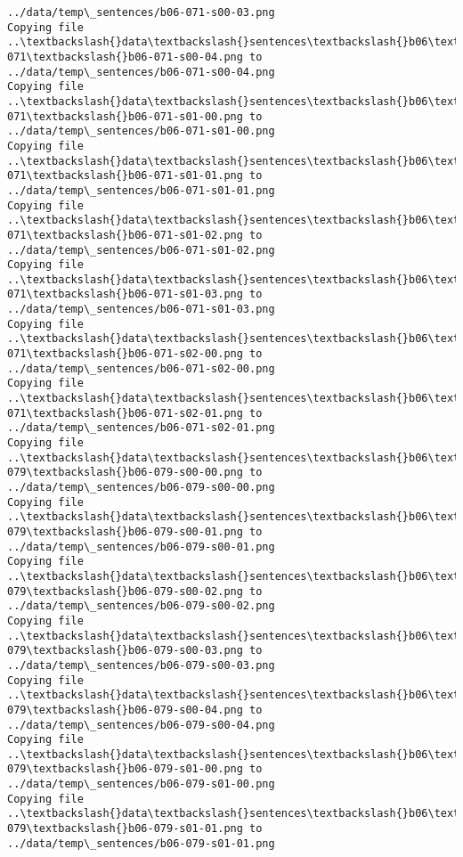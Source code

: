 \documentclass[11pt]{article}
\begin{document}
\begin{Verbatim}[commandchars=\\\{\}]
../data/temp\_sentences/b06-071-s00-03.png
Copying file ..\textbackslash{}data\textbackslash{}sentences\textbackslash{}b06\textbackslash{}b06-071\textbackslash{}b06-071-s00-04.png to
../data/temp\_sentences/b06-071-s00-04.png
Copying file ..\textbackslash{}data\textbackslash{}sentences\textbackslash{}b06\textbackslash{}b06-071\textbackslash{}b06-071-s01-00.png to
../data/temp\_sentences/b06-071-s01-00.png
Copying file ..\textbackslash{}data\textbackslash{}sentences\textbackslash{}b06\textbackslash{}b06-071\textbackslash{}b06-071-s01-01.png to
../data/temp\_sentences/b06-071-s01-01.png
Copying file ..\textbackslash{}data\textbackslash{}sentences\textbackslash{}b06\textbackslash{}b06-071\textbackslash{}b06-071-s01-02.png to
../data/temp\_sentences/b06-071-s01-02.png
Copying file ..\textbackslash{}data\textbackslash{}sentences\textbackslash{}b06\textbackslash{}b06-071\textbackslash{}b06-071-s01-03.png to
../data/temp\_sentences/b06-071-s01-03.png
Copying file ..\textbackslash{}data\textbackslash{}sentences\textbackslash{}b06\textbackslash{}b06-071\textbackslash{}b06-071-s02-00.png to
../data/temp\_sentences/b06-071-s02-00.png
Copying file ..\textbackslash{}data\textbackslash{}sentences\textbackslash{}b06\textbackslash{}b06-071\textbackslash{}b06-071-s02-01.png to
../data/temp\_sentences/b06-071-s02-01.png
Copying file ..\textbackslash{}data\textbackslash{}sentences\textbackslash{}b06\textbackslash{}b06-079\textbackslash{}b06-079-s00-00.png to
../data/temp\_sentences/b06-079-s00-00.png
Copying file ..\textbackslash{}data\textbackslash{}sentences\textbackslash{}b06\textbackslash{}b06-079\textbackslash{}b06-079-s00-01.png to
../data/temp\_sentences/b06-079-s00-01.png
Copying file ..\textbackslash{}data\textbackslash{}sentences\textbackslash{}b06\textbackslash{}b06-079\textbackslash{}b06-079-s00-02.png to
../data/temp\_sentences/b06-079-s00-02.png
Copying file ..\textbackslash{}data\textbackslash{}sentences\textbackslash{}b06\textbackslash{}b06-079\textbackslash{}b06-079-s00-03.png to
../data/temp\_sentences/b06-079-s00-03.png
Copying file ..\textbackslash{}data\textbackslash{}sentences\textbackslash{}b06\textbackslash{}b06-079\textbackslash{}b06-079-s00-04.png to
../data/temp\_sentences/b06-079-s00-04.png
Copying file ..\textbackslash{}data\textbackslash{}sentences\textbackslash{}b06\textbackslash{}b06-079\textbackslash{}b06-079-s01-00.png to
../data/temp\_sentences/b06-079-s01-00.png
Copying file ..\textbackslash{}data\textbackslash{}sentences\textbackslash{}b06\textbackslash{}b06-079\textbackslash{}b06-079-s01-01.png to
../data/temp\_sentences/b06-079-s01-01.png

\end{Verbatim}
\end{document}
